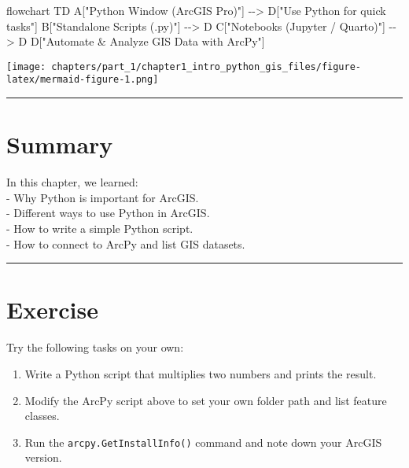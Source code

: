 \documentclass[
  11pt,
  letterpaper,
]{book}
\newenvironment{Shaded}{\begin{snugshade}}{\end{snugshade}}
\newcommand{\NormalTok}[1]{\textcolor[rgb]{0.00,0.23,0.31}{#1}}
\providecommand{\tightlist}{%
  \setlength{\itemsep}{0pt}\setlength{\parskip}{0pt}}
\begin{document}
\begin{Shaded}
\begin{Highlighting}[]
\NormalTok{flowchart TD}
\NormalTok{    A["Python Window (ArcGIS Pro)"] {-}{-}\textgreater{} D["Use Python for quick tasks"]}
\NormalTok{    B["Standalone Scripts (.py)"] {-}{-}\textgreater{} D}
\NormalTok{    C["Notebooks (Jupyter / Quarto)"] {-}{-}\textgreater{} D}
\NormalTok{    D["Automate \& Analyze GIS Data with ArcPy"]}
\end{Highlighting}
\end{Shaded}

\texttt{[image: chapters/part\_1/chapter1\_intro\_python\_gis\_files/figure-latex/mermaid-figure-1.png]}

\begin{center}\rule{0.5\linewidth}{0.5pt}\end{center}

\section{Summary}\label{summary}

In this chapter, we learned:\\
- Why Python is important for ArcGIS.\\
- Different ways to use Python in ArcGIS.\\
- How to write a simple Python script.\\
- How to connect to ArcPy and list GIS datasets.

\begin{center}\rule{0.5\linewidth}{0.5pt}\end{center}

\section{Exercise}\label{exercise}

Try the following tasks on your own:

\begin{enumerate}
\def\labelenumi{\arabic{enumi}.}
\tightlist
\item
  Write a Python script that multiplies two numbers and prints the
  result.\\
\item
  Modify the ArcPy script above to set your own folder path and list
  feature classes.\\
\item
  Run the \texttt{arcpy.GetInstallInfo()} command and note down your
  ArcGIS version.
\end{enumerate}
\end{document}
